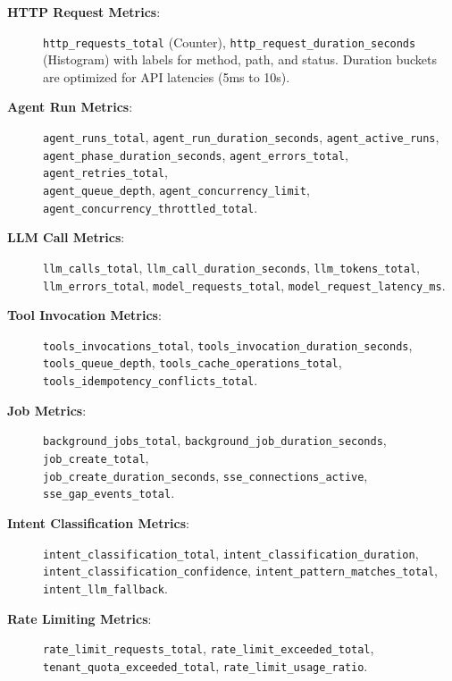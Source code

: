 \documentclass[a4paper,twoside]{sapthesis}
\begin{document}
\begin{description}
    \item[\textbf{HTTP Request Metrics}:] 
    \texttt{http\_requests\_total} (Counter), \texttt{http\_request\_duration\_seconds} (Histogram) with labels for method, path, and status. Duration buckets are optimized for API latencies (5ms to 10s).
    
    \item[\textbf{Agent Run Metrics}:] 
    \texttt{agent\_runs\_total}, \texttt{agent\_run\_duration\_seconds}, \texttt{agent\_active\_runs}, \\
    \texttt{agent\_phase\_duration\_seconds}, \texttt{agent\_errors\_total}, \texttt{agent\_retries\_total}, \\
    \texttt{agent\_queue\_depth}, \texttt{agent\_concurrency\_limit}, \texttt{agent\_concurrency\_throttled\_total}.
    
    \item[\textbf{LLM Call Metrics}:] 
    \texttt{llm\_calls\_total}, \texttt{llm\_call\_duration\_seconds}, \texttt{llm\_tokens\_total}, \\
    \texttt{llm\_errors\_total}, \texttt{model\_requests\_total}, \texttt{model\_request\_latency\_ms}.
    
    \item[\textbf{Tool Invocation Metrics}:] 
    \texttt{tools\_invocations\_total}, \texttt{tools\_invocation\_duration\_seconds}, \\
    \texttt{tools\_queue\_depth}, \texttt{tools\_cache\_operations\_total}, \texttt{tools\_idempotency\_conflicts\_total}.
    
    \item[\textbf{Job Metrics}:] 
    \texttt{background\_jobs\_total}, \texttt{background\_job\_duration\_seconds}, \texttt{job\_create\_total}, \\
    \texttt{job\_create\_duration\_seconds}, \texttt{sse\_connections\_active}, \texttt{sse\_gap\_events\_total}.
    
    \item[\textbf{Intent Classification Metrics}:] 
    \texttt{intent\_classification\_total}, \texttt{intent\_classification\_duration}, \\
    \texttt{intent\_classification\_confidence}, \texttt{intent\_pattern\_matches\_total}, \texttt{intent\_llm\_fallback}.
    
    \item[\textbf{Rate Limiting Metrics}:] 
    \texttt{rate\_limit\_requests\_total}, \texttt{rate\_limit\_exceeded\_total}, \\
    \texttt{tenant\_quota\_exceeded\_total}, \texttt{rate\_limit\_usage\_ratio}.
\end{description}
\end{document}
